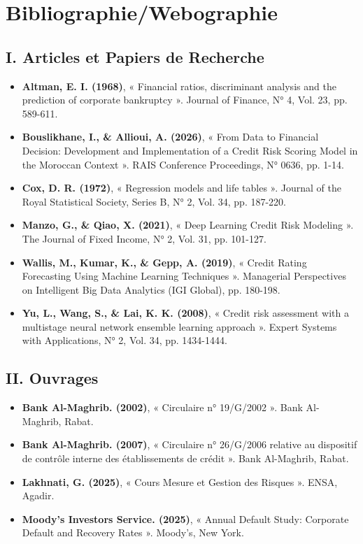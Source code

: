 \cleardoublepage
{}
{}
\chapter*{Bibliographie/Webographie}

\section*{I. Articles et Papiers de Recherche}
\begin{itemize}
    \item \textbf{Altman, E. I. (1968)}, « Financial ratios, discriminant analysis and the prediction of corporate bankruptcy ». Journal of Finance, N° 4, Vol. 23, pp. 589-611.
    \item \textbf{Bouslikhane, I., \& Allioui, A. (2026)}, « From Data to Financial Decision: Development and Implementation of a Credit Risk Scoring Model in the Moroccan Context ». RAIS Conference Proceedings, N° 0636, pp. 1-14.
    \item \textbf{Cox, D. R. (1972)}, « Regression models and life tables ». Journal of the Royal Statistical Society, Series B, N° 2, Vol. 34, pp. 187-220.
    \item \textbf{Manzo, G., \& Qiao, X. (2021)}, « Deep Learning Credit Risk Modeling ». The Journal of Fixed Income, N° 2, Vol. 31, pp. 101-127.
    \item \textbf{Wallis, M., Kumar, K., \& Gepp, A. (2019)}, « Credit Rating Forecasting Using Machine Learning Techniques ». Managerial Perspectives on Intelligent Big Data Analytics (IGI Global), pp. 180-198.
    \item \textbf{Yu, L., Wang, S., \& Lai, K. K. (2008)}, « Credit risk assessment with a multistage neural network ensemble learning approach ». Expert Systems with Applications, N° 2, Vol. 34, pp. 1434-1444.
\end{itemize}

\section*{II. Ouvrages}
\begin{itemize}
    \item \textbf{Bank Al-Maghrib. (2002)}, « Circulaire n° 19/G/2002 ». Bank Al-Maghrib, Rabat.

    \item \textbf{Bank Al-Maghrib. (2007)}, « Circulaire n° 26/G/2006 relative au dispositif de contrôle interne des établissements de crédit ». Bank Al-Maghrib, Rabat.

    \item \textbf{Lakhnati, G. (2025)}, « Cours Mesure et Gestion des Risques ». ENSA, Agadir.

    \item \textbf{Moody's Investors Service. (2025)}, « Annual Default Study: Corporate Default and Recovery Rates ». Moody's, New York.
\end{itemize}

